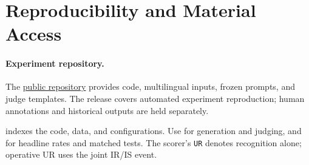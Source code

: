 \section{Reproducibility and Material Access}
\label{app:reproducibility}
\paragraph{Experiment repository.}
The \href{https://github.com/kevinjiang0121-cyber/IRIS}{public repository} provides code, multilingual inputs, frozen prompts, and judge templates. The release covers automated experiment reproduction; human annotations and historical outputs are held separately.

 indexes the code, data, and configurations. Use  for generation and judging, and  for headline rates and matched tests. The scorer's \texttt{UR} denotes recognition alone; operative UR uses the joint IR/IS event.
